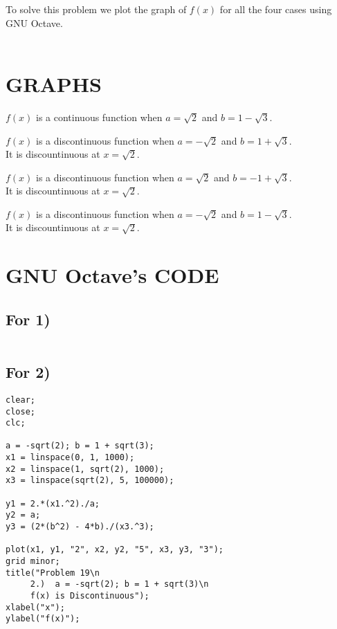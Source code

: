 To solve this problem we plot the graph of \(f(x)\) for all the four cases using GNU Octave. \\~\\

\section*{GRAPHS}
\(f(x)\) is a continuous function when \(a = \sqrt{2}\) and \(b= 1 - \sqrt{3}\). \par
\(f(x)\) is a discontinuous function when \(a = - \sqrt{2}\) and \(b= 1 + \sqrt{3}\).\\ It is discountinuous at \(x = \sqrt{2}\). \par
\(f(x)\) is a discontinuous function when \(a = \sqrt{2}\) and \(b= -1 + \sqrt{3}\).\\ It is discountinuous at \(x = \sqrt{2}\). \par
\(f(x)\) is a discontinuous function when \(a = - \sqrt{2}\) and \(b= 1 - \sqrt{3}\).\\ It is discountinuous at \(x = \sqrt{2}\). \par

\section*{GNU Octave's CODE}
\subsection{For 1)}
\begin{lstlisting}[frame = single]
\end{lstlisting}
\subsection{For 2)}
\begin{lstlisting}[frame = single]
clear;
close;
clc;

a = -sqrt(2); b = 1 + sqrt(3);
x1 = linspace(0, 1, 1000);
x2 = linspace(1, sqrt(2), 1000);
x3 = linspace(sqrt(2), 5, 100000);

y1 = 2.*(x1.^2)./a;
y2 = a;
y3 = (2*(b^2) - 4*b)./(x3.^3);

plot(x1, y1, "2", x2, y2, "5", x3, y3, "3");
grid minor;
title("Problem 19\n 
     2.)  a = -sqrt(2); b = 1 + sqrt(3)\n
     f(x) is Discontinuous");
xlabel("x");
ylabel("f(x)");
\end{lstlisting}
